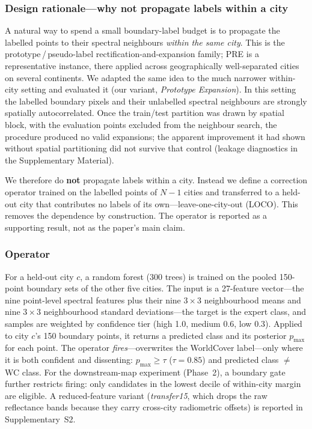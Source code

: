 \subsubsection*{Design rationale---why not propagate labels within a city}

A natural way to spend a small boundary-label budget is to propagate the
labelled points to their spectral neighbours \emph{within the same city}. This
is the prototype\,/\,pseudo-label rectification-and-expansion family; PRE
\citep{tong2024pre} is a representative instance, there applied across
geographically well-separated cities on several continents. We adapted the same
idea to the much narrower within-city setting and evaluated it (our variant,
\emph{Prototype Expansion}). In this setting the labelled boundary pixels and
their unlabelled spectral neighbours are strongly spatially autocorrelated. Once
the train/test partition was drawn by spatial block, with the evaluation points
excluded from the neighbour search, the procedure produced no valid expansions;
the apparent improvement it had shown without spatial partitioning did not
survive that control (leakage diagnostics in the Supplementary Material).

We therefore do \textbf{not} propagate labels within a city. Instead we define a
correction operator trained on the labelled points of $N - 1$ cities and
transferred to a held-out city that contributes no labels of its
own---leave-one-city-out (LOCO). This removes the dependence by construction.
The operator is reported as a supporting result, not as the paper's main claim.

\subsubsection*{Operator}

For a held-out city $c$, a random forest (300 trees) is trained on the pooled
150-point boundary sets of the other five cities. The input is a 27-feature
vector---the nine point-level spectral features plus their nine $3 \times 3$
neighbourhood means and nine $3 \times 3$ neighbourhood standard
deviations---the target is the expert class, and samples are weighted by
confidence tier (high 1.0, medium 0.6, low 0.3). Applied to city $c$'s 150
boundary points, it returns a predicted class and its posterior $p_{\max}$ for
each point. The operator \emph{fires}---overwrites the WorldCover label---only
where it is both confident and dissenting: $p_{\max} \ge \tau$ ($\tau = 0.85$)
and predicted class $\neq$ WC class. For the downstream-map experiment
(Phase~2), a boundary gate further restricts firing: only candidates in the
lowest decile of within-city margin are eligible. A reduced-feature variant
(\emph{transfer15}, which drops the raw reflectance bands because they carry
cross-city radiometric offsets) is reported in Supplementary~S2.

